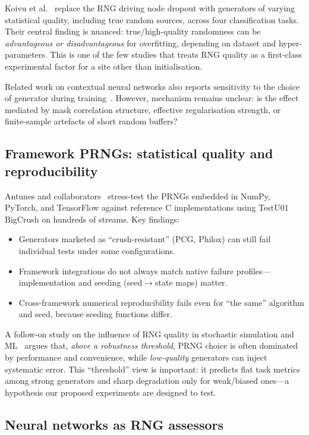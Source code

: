 Koivu et al.~\cite{koivu2022dropout} replace the RNG driving node dropout with generators of varying statistical quality, including true random sources, across four classification tasks.
Their central finding is nuanced: true/high-quality randomness can be \emph{advantageous or disadvantageous} for overfitting, depending on dataset and hyper-parameters.
This is one of the few studies that treats RNG quality as a first-class experimental factor for a site other than initialisation.

Related work on contextual neural networks also reports sensitivity to the choice of generator during training~\cite{huk2021contextual}.
However, mechanism remains unclear: is the effect mediated by mask correlation structure, effective regularisation strength, or finite-sample artefacts of short random buffers?

\subsection{Framework PRNGs: statistical quality and reproducibility}

Antunes and collaborators~\cite{antunes2025statistical,antunes2024reproducibility} stress-test the PRNGs embedded in NumPy, PyTorch, and TensorFlow against reference C implementations using TestU01 BigCrush on hundreds of streams.
Key findings:
\begin{itemize}[leftmargin=*]
  \item Generators marketed as ``crush-resistant'' (PCG, Philox) can still fail individual tests under some configurations.
  \item Framework integrations do not always match native failure profiles---implementation and seeding (seed$\to$state maps) matter.
  \item Cross-framework numerical reproducibility fails even for ``the same'' algorithm and seed, because seeding functions differ.
\end{itemize}
A follow-on study on the influence of RNG quality in stochastic simulation and ML~\cite{antunes2025influence} argues that, \emph{above a robustness threshold}, PRNG choice is often dominated by performance and convenience, while \emph{low-quality} generators can inject systematic error.
This ``threshold'' view is important: it predicts flat task metrics among strong generators and sharp degradation only for weak/biased ones---a hypothesis our proposed experiments are designed to test.

\subsection{Neural networks as RNG assessors}

